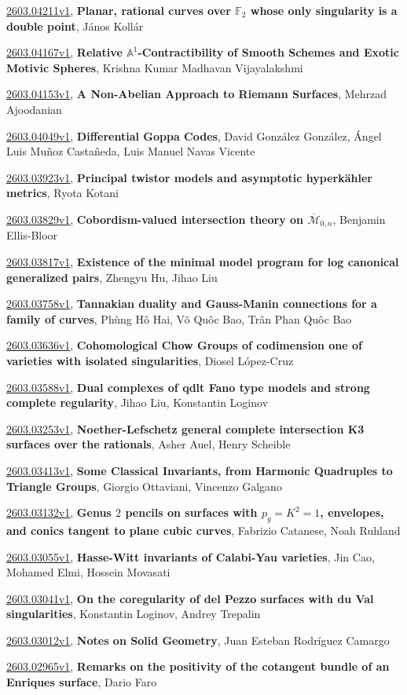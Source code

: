 \documentclass[9pt, a4paper]{article}
\theoremstyle{plain}
\theoremstyle{definition}
\theoremstyle{remark}
\newcommand{\arxiv}[3]{\href{https://arxiv.org/abs/#1}{#1}, \textbf{\textcolor{arxivblue}{#2}}, #3}
\begin{document}
\arxiv{2603.04211v1}{Planar, rational curves over ${\mathbb F}_2$ whose only singularity is a double point}{János Kollár}

\arxiv{2603.04167v1}{Relative $\mathbb{A}^1$-Contractibility of Smooth Schemes and Exotic Motivic Spheres}{Krishna Kumar Madhavan Vijayalakshmi}

\arxiv{2603.04153v1}{A Non-Abelian Approach to Riemann Surfaces}{Mehrzad Ajoodanian}

\arxiv{2603.04049v1}{Differential Goppa Codes}{David González González, Ángel Luis Muñoz Castañeda, Luis Manuel Navas Vicente}

\arxiv{2603.03923v1}{Principal twistor models and asymptotic hyperkähler metrics}{Ryota Kotani}

\arxiv{2603.03829v1}{Cobordism-valued intersection theory on $\overline{\mathcal{M}}_{0,n}$}{Benjamin Ellis-Bloor}

\arxiv{2603.03817v1}{Existence of the minimal model program for log canonical generalized pairs}{Zhengyu Hu, Jihao Liu}

\arxiv{2603.03758v1}{Tannakian duality and Gauss-Manin connections for a family of curves}{Phùng Hô Hai, Võ Quôc Bao, Trân Phan Quôc Bao}

\arxiv{2603.03636v1}{Cohomological Chow Groups of codimension one of varieties with isolated singularities}{Diosel López-Cruz}

\arxiv{2603.03588v1}{Dual complexes of qdlt Fano type models and strong complete regularity}{Jihao Liu, Konstantin Loginov}

\arxiv{2603.03253v1}{Noether-Lefschetz general complete intersection K3 surfaces over the rationals}{Asher Auel, Henry Scheible}

\arxiv{2603.03413v1}{Some Classical Invariants, from Harmonic Quadruples to Triangle Groups}{Giorgio Ottaviani, Vincenzo Galgano}

\arxiv{2603.03132v1}{Genus $2$ pencils on surfaces with $p_g=K^2=1$, envelopes, and conics tangent to plane cubic curves}{Fabrizio Catanese, Noah Ruhland}

\arxiv{2603.03055v1}{Hasse-Witt invariants of Calabi-Yau varieties}{Jin Cao, Mohamed Elmi, Hossein Movasati}

\arxiv{2603.03041v1}{On the coregularity of del Pezzo surfaces with du Val singularities}{Konstantin Loginov, Andrey Trepalin}

\arxiv{2603.03012v1}{Notes on Solid Geometry}{Juan Esteban Rodríguez Camargo}

\arxiv{2603.02965v1}{Remarks on the positivity of the cotangent bundle of an Enriques surface}{Dario Faro}
\end{document}
